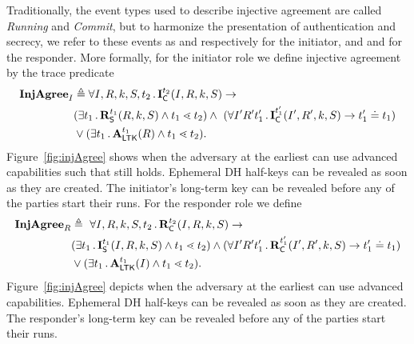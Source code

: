 Traditionally, the event types used to describe injective agreement are called
\emph{Running} and \emph{Commit}, but to harmonize the presentation of
authentication and secrecy, we refer to these events as \mIStart{} and
\mIComplete{} respectively for the initiator, and \mRStart{} and \mRComplete{}
for the responder.
%
More formally, for the initiator role we define injective agreement by the
trace predicate
\begin{align*}
    \mathbf{InjAgree}_I& \triangleq
    \forall I, R, k, S, t_2\operatorname{.} \mathbf{I}_{\textsf{C}}^{t_2}(I, R, k, S)
    \rightarrow\\
    &(\exists t_1\operatorname{.} \mathbf{R}_{\textsf{S}}^{t_1}(R, k, S) \land t_1 \lessdot t_2)
    \land\ (\forall I' R' t_1' \operatorname{.} \mathbf{I}_{\textsf{C}}^{t_1'}(I' , R', k, S)
        \rightarrow t_1' \doteq t_1) \\
    &\lor(\exists t_1\operatorname{.} \mathbf{A}_{\textsf{LTK}}^{t_1}(R) \land t_1 \lessdot t_2).
\end{align*}
%
Figure~\ref{fig:injAgree} shows when the adversary at the earliest can use
advanced capabilities such that \mPredInjI{} still holds.
%
Ephemeral DH half-keys can be revealed as soon as they are created.
%
The initiator's long-term key can be revealed before any of the parties start
their runs.
%
For the responder role we define
\begin{align*}
    \mathbf{InjAgree}_R& \triangleq\
    \forall I, R, k, S, t_2\operatorname{.} \mathbf{R}_{\textsf{C}}^{t_2}(I, R, k, S)
    \rightarrow\\
    &(\exists t_1\operatorname{.} \mathbf{I}_{\textsf{S}}^{t_1}(I, R, k, S) \land t_1 \lessdot t_2)
    \land (\forall I' R' t_1' \operatorname{.} \mathbf{R}_{\textsf{C}}^{t_1'}(I' , R', k, S)
        \rightarrow t_1' \doteq t_1)\\
    &\lor(\exists t_1\operatorname{.} \mathbf{A}_{\textsf{LTK}}^{t_1}(I) \land t_1 \lessdot t_2).
\end{align*}
%
Figure~\ref{fig:injAgree} depicts when the adversary at the earliest can use
advanced capabilities.
%
Ephemeral DH half-keys can be revealed as soon as they are created.
%
The responder's long-term key can be revealed before any of the parties start
their runs.
%
